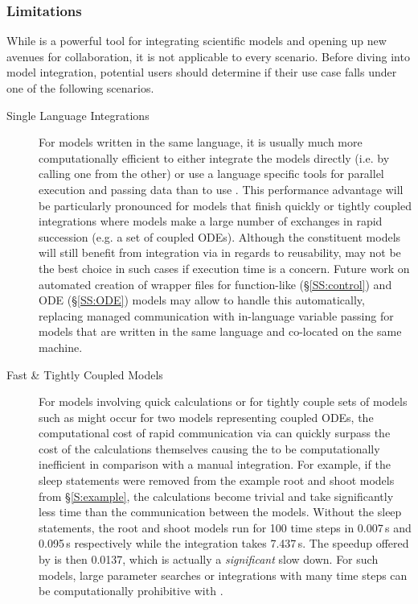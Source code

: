 \documentclass[journal]{IEEEtran}
\newcommand{\todo}[1]{{\color{red}{#1}}}
\newcommand{\pkg}{{\tt \todo{cis\_interface}}{}}
\begin{document}
\subsubsection{Limitations}\label{SS:limitations}
%
While {\pkg} is a powerful tool for integrating scientific models and opening up new avenues for collaboration, it is not applicable to every scenario. Before diving into model integration, potential users should determine if their use case falls under one of the following scenarios.
%
\begin{description}
	\item[Single Language Integrations] For models written in the same language, it is usually much more computationally efficient to either integrate the models directly (i.e. by calling one from the other) or use a language specific tools for parallel execution and passing data \citep[e.g. Parsl in Python][]{babuji18} than to use {\pkg}. This performance advantage will be particularly pronounced for models that finish quickly or tightly coupled integrations where models make a large number of exchanges in rapid succession (e.g. a set of coupled ODEs). Although the constituent models will still benefit from integration via {\pkg} in regards to reusability, {\pkg} may not be the best choice in such cases if execution time is a concern. Future work on automated creation of wrapper files for function-like (\S\ref{SS:control}) and ODE (\S\ref{SS:ODE}) models may allow {\pkg} to handle this automatically, replacing managed communication with in-language variable passing for models that are written in the same language and co-located on the same machine.
	\item[Fast \& Tightly Coupled Models] For models involving quick calculations or for tightly couple sets of models such as might occur for two models representing coupled ODEs, the computational cost of rapid communication via {\pkg} can quickly surpass the cost of the calculations themselves causing the {\pkg} to be computationally inefficient in comparison with a manual integration. For example, if the sleep statements were removed from the example root and shoot models from \S\ref{S:example}, the calculations become trivial and take significantly less time than the communication between the models. Without the sleep statements, the root and shoot models run for 100 time steps in 0.007\,s and 0.095\,s respectively while the integration takes 7.437\,s. The speedup offered by {\pkg} is then 0.0137, which is actually a \emph{significant} slow down. For such models, large parameter searches or integrations with many time steps can be computationally prohibitive with {\pkg}.

\end{description}
\end{document}
